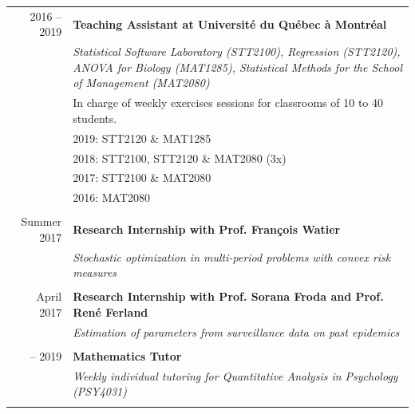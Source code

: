\documentclass[11pt, sans]{moderncv}
\begin{document}
\begin{longtable}{rp{13.34cm}}
	2016 -- 2019 \hspace{10pt}& \textbf{Teaching Assistant at Université du Québec à Montréal} \\
	&\textit{Statistical Software Laboratory (STT2100), Regression (STT2120), ANOVA for Biology (MAT1285), Statistical Methods for the School of Management (MAT2080)}\\
	\vspace{-5pt}
	&{\small In charge of weekly exercises sessions for classrooms of 10 to 40 students.}\\
	\vspace{-10pt}
	&{\small \color{gray}{$\circ$}} {\small 2019: STT2120 \& MAT1285}\\
	\vspace{-10pt}
	&{\small \color{gray}{$\circ$}} {\small 2018: STT2100, STT2120 \& MAT2080 (3x)}\\
	\vspace{-10pt}
	&{\small \color{gray}{$\circ$}} {\small 2017: STT2100 \& MAT2080}\\
	&{\small \color{gray}{$\circ$}} {\small 2016: MAT2080}\\
	&\\
	
	Summer 2017 \hspace{10pt}& \textbf{Research Internship with Prof. François Watier} \\
	&\textit{Stochastic optimization in multi-period problems with convex risk measures}\\
	&\\
	
	April 2017 \hspace{10pt}& \textbf{Research Internship with Prof. Sorana Froda and Prof. René Ferland} \\
	&\textit{Estimation of parameters from surveillance data on past epidemics}\\
	&\\
	\newpage
	2017 -- 2019 \hspace{10pt}& \textbf{Mathematics Tutor} \\
	&\textit{Weekly individual tutoring for Quantitative Analysis in Psychology (PSY4031)}\\
	&\\
	

\end{longtable}
\end{document}
